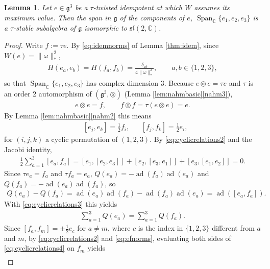 \documentclass [leqno, 10pt]{amsart}
\newtheorem{lemma}[theorem]{Lemma}%
\theoremstyle{definition}
\numberwithin{equation}{section}
\newcommand{\tmlt}{\circledcirc}
\newcommand{\om}{\omega}
\newcommand{\spn}{\operatorname{Span}}
\newcommand{\sll}{\mathfrak{sl}}
\newcommand{\g}{\mathfrak{g}}
\newcommand{\ad}{\operatorname{ad}}
\newcommand{\com}{\mathbb C}
\newcommand{\comass}[1]{\lVert #1\rVert_{\ast}}%
\newcommand{\qad}{Q}
\begin{document}
\begin{lemma}\label{lem:rigidity}
Let $e\in \g^{3}$ be a $\tau$-twisted idempotent at which $W$ assumes its maximum value. Then the span in $\g$ of the components of $e$, $\spn_{\com}\{e_{1}, e_{2}, e_{3}\}$ is a $\tau$-stable subalgebra of $\g$ isomorphic to $\sll(2, \com)$.
\end{lemma}
\begin{proof}
Write $f := \tau e$. By \eqref{eq:idemnorms} of Lemma \ref{thm:idem}, since $W(e) = \comass{\om}^{2}$,
\begin{align}\label{eq:efnorms}
H(e_{a}, e_{b}) = H(f_{a}, f_{b}) = \frac{\delta_{ab}}{4\comass{\om}^{2}}, \qquad a, b \in \{1, 2, 3\},
\end{align}
so that $\spn_{\com}\{e_{1}, e_{2}, e_{3}\}$ has complex dimension $3$. Because $e \tmlt e = \tau e$ and $\tau$ is an order $2$ automorphism of $(\g^{3}, \tmlt)$ (Lemma \ref{lem:nahmbasic}\ref{nahm3}),
\begin{align}\label{eq:cyclicrelations}
e \tmlt e = f, \qquad f \tmlt f = \tau(e \tmlt e) = e.
\end{align}
By Lemma \ref{lem:nahmbasic}\ref{nahm2} this means
\begin{align}\label{eq:cyclicrelations2}
&[e_{j}, e_{k}] = \tfrac{1}{2}f_{i}, && [f_{j}, f_{k}] = \tfrac{1}{2}e_{i},
\end{align}
for $(i, j, k)$ a cyclic permutation of $(1, 2, 3)$.
By \eqref{eq:cyclicrelations2} and the Jacobi identity,
\begin{align}\label{eq:cyclicrelations3}
\tfrac{1}{2}\sum_{a=1}^{3}[e_{a}, f_{a}] = [e_{1}, [e_{2}, e_{3}]] + [e_{2}, [e_{3}, e_{1}]] + [e_{3}, [e_{1}, e_{2}]] = 0.
\end{align}
Since $\tau e_{a} = f_{a}$ and $\tau f_{a} = e_{a}$, $\qad(e_{a}) = -\ad(f_{a})\ad(e_{a})$ and $\qad(f_{a}) = -\ad(e_{a})\ad(f_{a})$, so
\begin{align}
\qad(e_{a}) - \qad(f_{a}) = \ad(e_{a})\ad(f_{a}) - \ad(f_{a})\ad(e_{a}) = \ad([e_{a}, f_{a}]).
\end{align}
With \eqref{eq:cyclicrelations3} this yields
\begin{align}\label{eq:cyclicrelations4}
\sum_{a=1}^{3}\qad(e_{a}) = \sum_{a=1}^{3}\qad(f_{a}).
\end{align}
Since $[f_{a}, f_{m}] = \pm\tfrac{1}{2}e_{c}$ for $a \neq m$, where $c$ is the index in $\{1, 2, 3\}$ different from $a$ and $m$, by \eqref{eq:cyclicrelations2} and \eqref{eq:efnorms}, evaluating both sides of \eqref{eq:cyclicrelations4} on $f_{m}$ yields
\begin{align}\label{eq:sumrule}

\end{align}
\end{proof}
\end{document}
